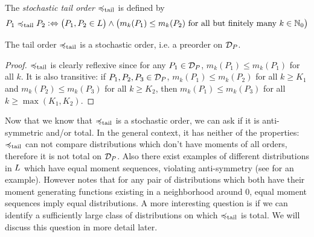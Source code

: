\documentclass[a4paper]{scrreprt}
\begin{document}
    \begin{defn}[Stochastic Tail Order]
        The \emph{stochastic tail order} $\preccurlyeq_{\text{tail}}$ is defined by
        \begin{gather*}
            P_1 \preccurlyeq_{\text{tail}} P_2 \mathrel{\vcentcolon\Leftrightarrow} \bigl(P_1, P_2 \in L\bigr) \wedge \bigl(m_k(P_1) \leq m_k(P_2) \text{ for all but finitely many $k \in \mathbb{N}_0$}\bigr)
        \end{gather*}
    \end{defn}

    \begin{lemma}
        The tail order $\preccurlyeq_{\text{tail}}$ is a stochastic order, i.e. a preorder on $\mathcal{D}_P$.
    \end{lemma}
    \begin{proof}
        $\preccurlyeq_{\text{tail}}$ is clearly reflexive since for any $P_1 \in \mathcal{D}_P$, $m_k(P_1) \leq m_k(P_1)$ for all $k$.
        It is also transitive: if $P_1, P_2, P_3 \in \mathcal{D}_P$, $m_k(P_1) \leq m_k(P_2)$ for all $k \geq K_1$ and $m_k(P_2) \leq m_k(P_3)$ for all $k \geq K_2$, then $m_k(P_1) \leq m_k(P_3)$ for all $k \geq \max(K_1, K_2)$.
    \end{proof}
    
    Now that we know that $\preccurlyeq_{\text{tail}}$ is a stochastic order, we can ask if it is anti-symmetric and/or total.
    In the general context, it has neither of the properties: $\preccurlyeq_{\text{tail}}$ can not compare distributions which don't have moments of all orders, therefore it is not total on $\mathcal{D}_P$.
    Also there exist examples of different distributions in $L$ which have equal moment sequences, violating anti-symmetry (see \cite[p.49, 3.15]{bib:romanoCounterexamplesInProbability} for an example). However \cite{bib:rassGameRiskManagI} notes that for any pair of distributions which both have their moment generating functions existing in a neighborhood around 0, equal moment sequences imply equal distributions.
    A more interesting question is if we can identify a sufficiently large class of distributions on which $\preccurlyeq_{\text{tail}}$ is total. We will discuss this question in more detail later.
    
\end{document}
